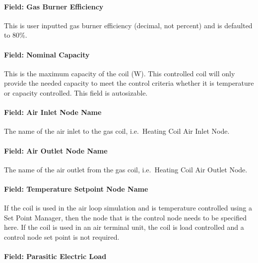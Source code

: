 \paragraph{Field: Gas Burner Efficiency}\label{field-gas-burner-efficiency}

This is user inputted gas burner efficiency (decimal, not percent) and is defaulted to 80\%.

\paragraph{Field: Nominal Capacity}\label{field-nominal-capacity-1-000}

This is the maximum capacity of the coil (W). This controlled coil will only provide the needed capacity to meet the control criteria whether it is temperature or capacity controlled. This field is autosizable.

\paragraph{Field: Air Inlet Node Name}\label{field-air-inlet-node-name-6}

The name of the air inlet to the gas coil, i.e.~Heating Coil Air Inlet Node.

\paragraph{Field: Air Outlet Node Name}\label{field-air-outlet-node-name-6-000}

The name of the air outlet from the gas coil, i.e.~Heating Coil Air Outlet Node.

\paragraph{Field: Temperature Setpoint Node Name}\label{field-temperature-setpoint-node-name-4}

If the coil is used in the air loop simulation and is temperature controlled using a Set Point Manager, then the node that is the control node needs to be specified here. If the coil is used in an air terminal unit, the coil is load controlled and a control node set point is not required.

\paragraph{Field: Parasitic Electric Load}\label{field-parasitic-electric-load-1}

